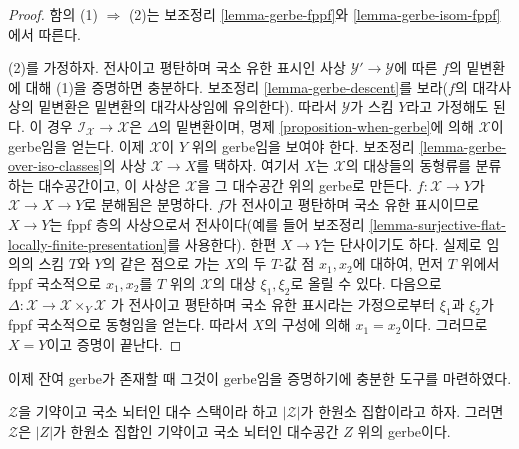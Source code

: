 \begin{proof}
함의 (1) $\Rightarrow$ (2)는 보조정리 \ref{lemma-gerbe-fppf}와
\ref{lemma-gerbe-isom-fppf}에서 따른다.

\medskip\noindent
(2)를 가정하자. 전사이고 평탄하며 국소 유한 표시인 사상
$\mathcal{Y}' \to \mathcal{Y}$에 따른 $f$의 밑변환에 대해 (1)을
증명하면 충분하다. 보조정리 \ref{lemma-gerbe-descent}를 보라($f$의
대각사상의 밑변환은 밑변환의 대각사상임에 유의한다). 따라서
$\mathcal{Y}$가 스킴 $Y$라고 가정해도 된다. 이 경우
$\mathcal{I}_\mathcal{X} \to \mathcal{X}$은 $\Delta$의 밑변환이며,
명제 \ref{proposition-when-gerbe}에 의해 $\mathcal{X}$이 gerbe임을
얻는다. 이제 $\mathcal{X}$이 $Y$ 위의 gerbe임을 보여야 한다.
보조정리 \ref{lemma-gerbe-over-iso-classes}의 사상
$\mathcal{X} \to X$를 택하자. 여기서 $X$는 $\mathcal{X}$의 대상들의
동형류를 분류하는 대수공간이고, 이 사상은 $\mathcal{X}$을 그 대수공간 위의
gerbe로 만든다. $f : \mathcal{X} \to Y$가
$\mathcal{X} \to X \to Y$로 분해됨은 분명하다. $f$가 전사이고 평탄하며
국소 유한 표시이므로 $X \to Y$는 fppf 층의 사상으로서 전사이다(예를
들어 보조정리 \ref{lemma-surjective-flat-locally-finite-presentation}를
사용한다). 한편 $X \to Y$는 단사이기도 하다. 실제로 임의의 스킴 $T$와
$Y$의 같은 점으로 가는 $X$의 두 $T$-값 점 $x_1, x_2$에 대하여, 먼저
$T$ 위에서 fppf 국소적으로 $x_1, x_2$를 $T$ 위의 $\mathcal{X}$의 대상
$\xi_1, \xi_2$로 올릴 수 있다. 다음으로
$\Delta : \mathcal{X} \to \mathcal{X} \times_Y \mathcal{X}$
가 전사이고 평탄하며 국소 유한 표시라는 가정으로부터 $\xi_1$과
$\xi_2$가 fppf 국소적으로 동형임을 얻는다. 따라서 $X$의 구성에 의해
$x_1 = x_2$이다. 그러므로 $X = Y$이고 증명이 끝난다.
\end{proof}

\noindent
이제 잔여 gerbe가 존재할 때 그것이 gerbe임을 증명하기에 충분한 도구를
마련하였다.

\begin{lemma}
\label{lemma-noetherian-singleton-stack-gerbe}
$\mathcal{Z}$을 기약이고 국소 뇌터인 대수 스택이라 하고
$|\mathcal{Z}|$가 한원소 집합이라고 하자. 그러면 $\mathcal{Z}$은
$|Z|$가 한원소 집합인 기약이고 국소 뇌터인 대수공간 $Z$ 위의
gerbe이다.
\end{lemma}

